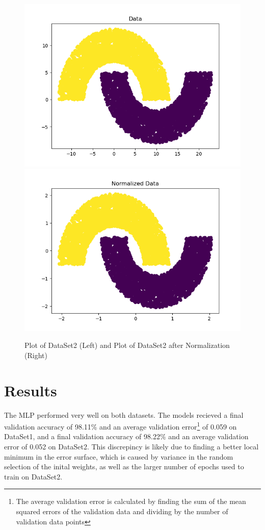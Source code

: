 \documentclass[letterpaper, 12pt]{article}
\begin{document}
\begin{figure}
\centering
\includegraphics[scale = 0.5]{DataSet2Plot}
\includegraphics[scale = 0.5]{DataSet2NormalizedPlot}
\caption{Plot of DataSet2 (Left) and Plot of DataSet2 after Normalization (Right)}
\end{figure}

\section{Results}

The MLP performed very well on both datasets. The models recieved a final validation accuracy of 98.11\% and an average validation error\footnote{The average validation error is calculated by finding the sum of the mean squared errors of the validation data and dividing by the number of validation data points} of 0.059 on DataSet1, and a final validation accuracy of 98.22\% and an average validation error of 0.052 on DataSet2. This discrepincy is likely due to finding a better local minimum in the error surface, which is caused by variance in the random selection of the inital weights, as well as the larger number of epochs used to train on DataSet2.
\end{document}
